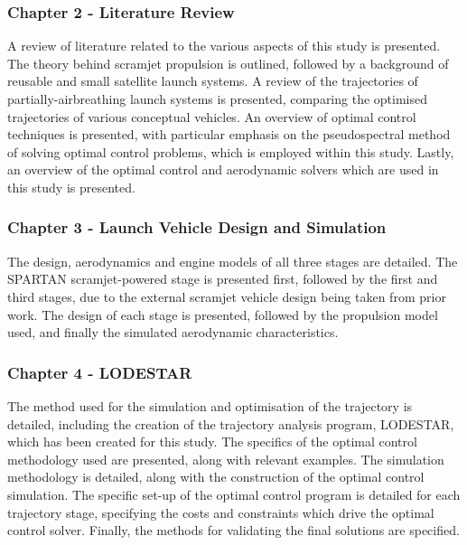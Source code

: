     

    \subsubsection*{Chapter 2 - Literature Review}

      A review of literature related to the various aspects of this study is presented. The theory behind scramjet propulsion is outlined, followed by a background of reusable and small satellite launch systems. A review of the trajectories of partially-airbreathing launch systems is presented, comparing the optimised trajectories of various conceptual vehicles. An overview of optimal control techniques is presented, with particular emphasis on the pseudospectral method of solving optimal control problems, which is employed within this study. Lastly, an overview of the optimal control and aerodynamic solvers which are used in this study is presented.
      

    \subsubsection*{Chapter 3 - Launch Vehicle Design and Simulation}

      The design, aerodynamics and engine models of all three stages are detailed. The SPARTAN scramjet-powered stage is presented first, followed by the first and third stages, due to the external scramjet vehicle design being taken from prior work. The design of each stage is presented, followed by the propulsion model used, and finally the simulated aerodynamic characteristics. 
      
      
      \subsubsection*{Chapter 4 - LODESTAR}
      
      The method used for the simulation and optimisation of the trajectory is detailed, including the creation of the trajectory analysis program, LODESTAR, which has been created for this study. The specifics of the optimal control methodology used are presented, along with relevant examples. The simulation methodology is detailed, along with the construction of the optimal control simulation. The specific set-up of the optimal control program is detailed for each trajectory stage, specifying the costs and constraints which drive the optimal control solver. Finally, the methods for validating the final solutions are specified.
      

